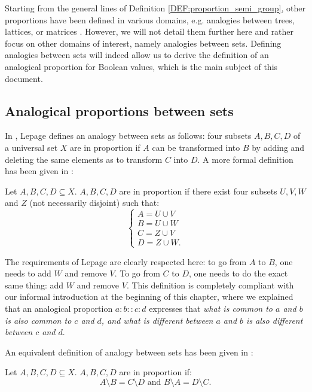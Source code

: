 Starting from the general lines of Definition \ref{DEF:proportion_semi_group},
other proportions have been defined in various domains, e.g. analogies
between trees, lattices, or matrices \cite{MicDel04, StrYvoREPORT05,
MicBayDelJAIR08}. However, we will not detail them further here and rather
focus on other domains of interest, namely analogies between sets. Defining
analogies between sets will indeed allow us to derive the definition of an
analogical proportion for Boolean values, which is the main subject of this
document.

\subsection{Analogical proportions between sets}

In \cite{Lep03}, Lepage defines an analogy between sets as follows: four subsets
$A, B, C, D$ of a universal set $X$ are in proportion if $A$ can be transformed
into $B$ by adding and deleting the same elements as to transform $C$ into $D$.
A more formal definition has been given in \cite{StrYvoREPORT05}:

\begin{definition}
  \label{DEF:analogy_set_facto}
  Let $A, B, C, D \subseteq X$. $A, B, C, D$ are in proportion if there exist
  four subsets $U, V, W$ and $Z$ (not necessarily disjoint) such that:
  $$
  \begin{cases}
    A = U \cup V\\
    B = U \cup W\\
    C = Z \cup V\\
    D = Z \cup W.
  \end{cases}
  $$
\end{definition}

The requirements of Lepage are clearly respected here: to go from $A$ to $B$,
one needs to add $W$ and remove $V$. To go from $C$ to $D$, one needs to do the
exact same thing: add $W$ and remove $V$. This definition is completely
compliant with our informal introduction at the beginning of this chapter,
where we explained that an analogical proportion $a:b::c:d$ expresses that
\textit{what is common to $a$ and $b$ is also common to $c$ and $d$, and what
is different between $a$ and $b$ is also different between $c$ and $d$}.


An equivalent definition of analogy between sets has been given in
\cite{MicPra09}:

\begin{definition}
  \label{DEF:analogy_set_miclet_henri}
  Let $A, B, C, D \subseteq X$. $A, B, C, D$ are in proportion if:
  $$
  A \setminus B = C \setminus D \text{ and } B \setminus A = D \setminus C.
  $$
\end{definition}

